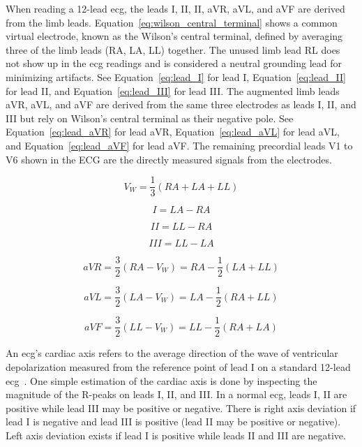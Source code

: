 \documentclass[\main/thesis.tex]{subfiles}
\begin{document}
When reading a 12-lead \gls{ecg}, the leads I, II, II, aVR, aVL, and aVF are derived from the limb leads.
Equation~\ref{eq:wilson_central_terminal} shows a common virtual electrode, known as the Wilson's central terminal, defined by averaging three of the limb leads (RA, LA, LL) together.
The unused limb lead RL does not show up in the \gls{ecg} readings and is considered a neutral grounding lead for minimizing artifacts.
See Equation~\ref{eq:lead_I} for lead I, Equation~\ref{eq:lead_II} for lead II, and Equation~\ref{eq:lead_III} for lead III.
The augmented limb leads aVR, aVL, and aVF are derived from the same three electrodes as leads I, II, and III but rely on Wilson's central terminal as their negative pole.
See Equation~\ref{eq:lead_aVR} for lead aVR, Equation~\ref{eq:lead_aVL} for lead aVL, and Equation~\ref{eq:lead_aVF} for lead aVF.
The remaining precordial leads V1 to V6 shown in the ECG are the directly measured signals from the electrodes.

\begin{equation}
    V_W = \dfrac{1}{3}(RA + LA + LL) \label{eq:wilson_central_terminal}
\end{equation}

\begin{equation}
    I = LA - RA \label{eq:lead_I}
\end{equation}

\begin{equation}
    II = LL - RA \label{eq:lead_II}
\end{equation}

\begin{equation}
    III = LL - LA \label{eq:lead_III}
\end{equation}

\begin{equation}
    aVR = \dfrac{3}{2}(RA - V_W) = RA - \dfrac{1}{2}(LA + LL) \label{eq:lead_aVR}
\end{equation}

\begin{equation}
    aVL = \dfrac{3}{2}(LA - V_W) = LA - \dfrac{1}{2}(RA + LL) \label{eq:lead_aVL}
\end{equation}

\begin{equation}
    aVF = \dfrac{3}{2}(LL - V_W) = LL - \dfrac{1}{2}(RA + LA) \label{eq:lead_aVF}
\end{equation}

An \gls{ecg}'s cardiac axis refers to the average direction of the wave of ventricular depolarization measured from the reference point of lead I on a standard 12-lead \gls{ecg}~\cite{meek_introduction_2002}.
One simple estimation of the cardiac axis is done by inspecting the magnitude of the R-peaks on leads I, II, and III.
In a normal \gls{ecg}, leads I, II are positive while lead III may be positive or negative.
There is right axis deviation if lead I is negative and lead III is positive (lead II may be positive or negative).
Left axis deviation exists if lead I is positive while leads II and III are negative.
\end{document}
